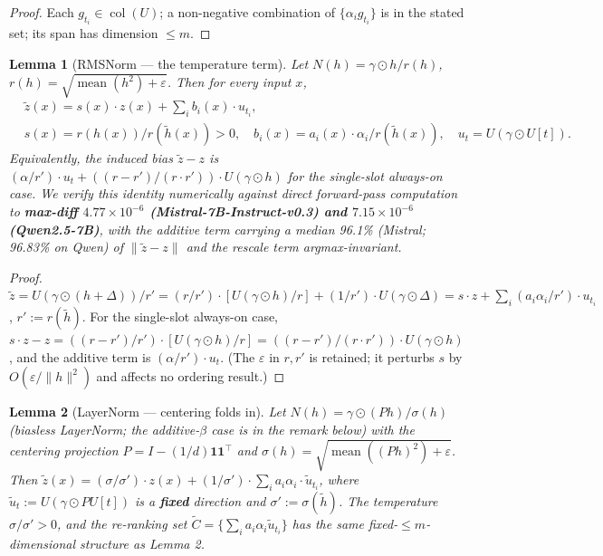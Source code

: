 \documentclass[11pt]{article}
\theoremstyle{plain}
\newtheorem{lemma}{Lemma}
\theoremstyle{definition}
\begin{document}
\begin{proof}
Each $g_{t_i} \in \operatorname{col}(U)$; a non-negative combination of $\{\alpha_i g_{t_i}\}$ is in the stated set; its span has dimension $\le m$.
\end{proof}

\begin{lemma}[RMSNorm — the temperature term]
Let $N(h) = \gamma \odot h / r(h)$, $r(h) = \sqrt{\operatorname{mean}(h^2)+\varepsilon}$. Then for every input $x$,
\begin{equation}\tag{2}
\begin{aligned}
&\tilde z(x) = s(x)\cdot z(x) + \sum_i b_i(x)\cdot u_{t_i},\\
&s(x) = r(h(x))/r(\tilde h(x)) > 0,\quad b_i(x) = a_i(x)\cdot\alpha_i / r(\tilde h(x)),\quad u_t = U(\gamma \odot U[t]).
\end{aligned}
\end{equation}
Equivalently, the induced bias $\tilde z - z$ is $(\alpha/r')\cdot u_t + ((r-r')/(r\cdot r'))\cdot U(\gamma\odot h)$ for the single-slot always-on case. We verify this identity numerically against direct forward-pass computation to \textbf{max-diff $4.77\times10^{-6}$ (Mistral-7B-Instruct-v0.3) and $7.15\times10^{-6}$ (Qwen2.5-7B)}, with the additive term carrying a median 96.1\% (Mistral; 96.83\% on Qwen) of $\lVert\tilde z-z\rVert$ and the rescale term argmax-invariant.
\end{lemma}

\begin{proof}
$\tilde z = U(\gamma \odot (h+\Delta))/r' = (r/r')\cdot[U(\gamma\odot h)/r] + (1/r')\cdot U(\gamma\odot\Delta) = s\cdot z + \sum_i (a_i\alpha_i/r')\cdot u_{t_i}$, $r' := r(\tilde h)$. For the single-slot always-on case, $s\cdot z - z = ((r-r')/r')\cdot[U(\gamma\odot h)/r] = ((r-r')/(r\cdot r'))\cdot U(\gamma\odot h)$, and the additive term is $(\alpha/r')\cdot u_t$. (The $\varepsilon$ in $r,r'$ is retained; it perturbs $s$ by $O(\varepsilon/\lVert h\rVert^2)$ and affects no ordering result.)
\end{proof}

\begin{lemma}[LayerNorm — centering folds in]
Let $N(h) = \gamma \odot (Ph)/\sigma(h)$ (biasless LayerNorm; the additive-$\beta$ case is in the remark below) with the centering projection $P = I - (1/d)\mathbf{1}\mathbf{1}^{\top}$ and $\sigma(h) = \sqrt{\operatorname{mean}((Ph)^2)+\varepsilon}$. Then $\tilde z(x) = (\sigma/\sigma')\cdot z(x) + (1/\sigma')\cdot\sum_i a_i \alpha_i \cdot \tilde u_{t_i}$, where $\tilde u_t := U(\gamma \odot P U[t])$ is a \textbf{fixed} direction and $\sigma' := \sigma(\tilde h)$. The temperature $\sigma/\sigma' > 0$, and the re-ranking set $\tilde C = \{\sum_i a_i\alpha_i \tilde u_{t_i}\}$ has the same fixed-$\le m$-dimensional structure as Lemma 2.
\end{lemma}
\end{document}

